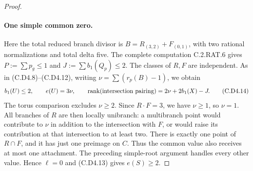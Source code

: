\begin{proof}
\paragraph{One simple common zero.}
Here the total reduced branch divisor is
$B=R_{(3,2)}+F_{(0,1)}$, with two rational normalizations
and total delta five. The complete computation C.2.RAT.6
gives $P:=\sum p_g\le1$ and
$J:=\sum b_1(Q_p)\le2$. The classes of $R,F$ are
independent. As in (C.D4.8)--(C.D4.12), writing
$\nu=\sum(r_p(B)-1)$, we obtain
\[
 b_1(U)\le2,\qquad e(U)=3\nu,\qquad
 \operatorname{rank}(\hbox{intersection pairing})
                         =2\nu+2b_1(X)-J.
\tag{C.D4.14}
\]
The torus comparison excludes $\nu\ge2$. Since $R\cdot F=3$,
we have $\nu\ge1$, so $\nu=1$. All branches of $R$ are
then locally unibranch: a multibranch point would contribute
to $\nu$ in addition to the intersection with $F$, or would
raise its contribution at that intersection to at least two.
There is exactly one point of $R\cap F$, and it has just
one preimage on $C$. Thus the common value also receives
at most one attachment. The preceding simple-root argument
handles every other value. Hence $\ell=0$ and (C.D4.13)
gives $e(S)\ge2$.


\end{proof}
